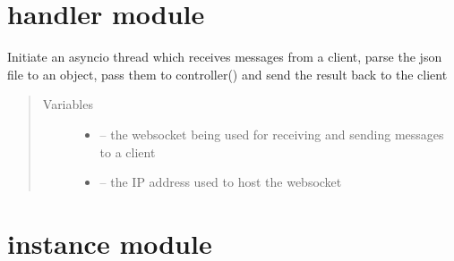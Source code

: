 \documentclass[letterpaper,10pt,english]{sphinxmanual}
\begin{document}
\section{handler module}
\label{\detokenize{handler:handler-module}}\label{\detokenize{handler:module-handler}}\label{\detokenize{handler::doc}}

\begin{fulllineitems}
\label{\detokenize{handler:handler.handler}}
Initiate an asyncio thread which receives messages from a client, parse the json file to an object, pass them to controller() and send the result back to the client
\begin{quote}\begin{description}
\item[{Variables}] \leavevmode\begin{itemize}
\item {} 
 -- the websocket being used for receiving and sending messages to a client

\item {} 
 -- the IP address used to host the websocket

\end{itemize}

\end{description}\end{quote}

\end{fulllineitems}



\section{instance module}
\label{\detokenize{instance:instance-module}}\label{\detokenize{instance:module-instance}}\label{\detokenize{instance::doc}}
\end{document}
